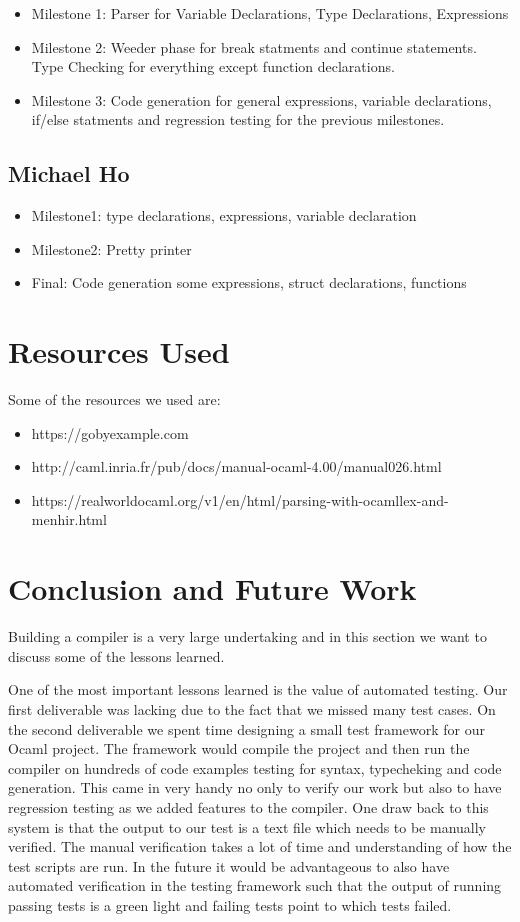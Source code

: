 \documentclass{article}
\begin{document}
\begin{itemize}
\item Milestone 1: Parser for Variable Declarations, Type Declarations, Expressions 
\item Milestone 2: Weeder phase for break statments and continue statements. Type Checking for everything except function declarations.  
\item Milestone 3: Code generation for general expressions, variable declarations, if/else statments and regression testing for the previous milestones. 
\end{itemize}
	
\subsection{Michael Ho}
\begin{itemize}
\item Milestone1: type declarations, expressions, variable declaration
\item Milestone2: Pretty printer
\item Final: Code generation some expressions, struct declarations, functions
\end{itemize}

\section{Resources Used}
Some of the resources we used are: 

\begin{itemize}
\item https://gobyexample.com  
\item http://caml.inria.fr/pub/docs/manual-ocaml-4.00/manual026.html
\item https://realworldocaml.org/v1/en/html/parsing-with-ocamllex-and-menhir.html
\end{itemize}


\section{Conclusion and Future Work}
Building a compiler is a very large undertaking and in this section we want to discuss some of the lessons learned.


One of the most important lessons learned is the value of automated testing. Our first deliverable was lacking due to the fact that we missed many test cases. On the second deliverable we spent time designing a small test framework for our Ocaml project. The framework would compile the project and then run the compiler on hundreds of code examples testing for syntax, typecheking and code generation. This came in very handy no only to verify our work but also to have regression testing as we added features to the compiler. One draw back to this system is that the output to our test is a text file which needs to be manually verified. The manual verification takes a lot of time and understanding of how the test scripts are run. In the future it would be advantageous to also have automated verification in the testing framework such that the output of running passing tests is a green light and failing tests point to which tests failed. 
\end{document}
